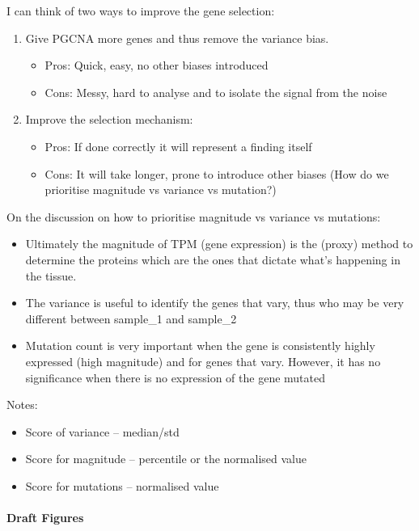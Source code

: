 I can think of two ways to improve the gene selection:
\begin{enumerate}
    \item Give PGCNA more genes and thus remove the variance bias.
          \begin{itemize}
              \item Pros: Quick, easy, no other biases introduced
              \item Cons: Messy, hard to analyse and to isolate the signal from the noise
          \end{itemize}
    \item Improve the selection mechanism:
          \begin{itemize}
              \item Pros: If done correctly it will represent a finding itself
              \item Cons: It will take longer, prone to introduce other biases (How do we prioritise magnitude vs variance vs mutation?)
          \end{itemize}
\end{enumerate}

On the discussion on how to prioritise magnitude vs variance vs mutations:
\begin{itemize}
    \item Ultimately the magnitude of TPM (gene expression) is the (proxy) method to determine the proteins which are the ones that dictate what's happening in the tissue.
    \item The variance is useful to identify the genes that vary, thus who may be very different between sample\_1 and sample\_2
    \item Mutation count is very important when the gene is consistently highly expressed (high magnitude) and for genes that vary. However, it has no significance when there is no expression of the gene mutated
\end{itemize}


Notes:
\begin{itemize}
    \item Score of variance – median/std
    \item Score for magnitude – percentile or the normalised value
    \item Score for mutations – normalised value
\end{itemize}

\paragraph{Draft Figures}

